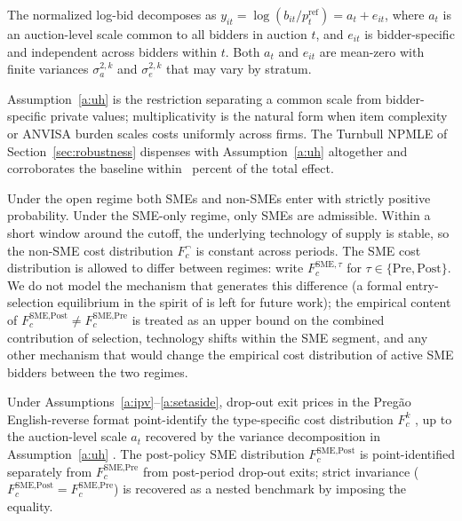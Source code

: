 \begin{assumption}\label{a:uh}
The normalized log-bid decomposes as $y_{it} = \log(b_{it} / p_t^{\mathrm{ref}}) = a_t + e_{it}$, where $a_t$ is an auction-level scale common to all bidders in auction $t$, and $e_{it}$ is bidder-specific and independent across bidders within $t$. Both $a_t$ and $e_{it}$ are mean-zero with finite variances $\sigma_a^{2,k}$ and $\sigma_e^{2,k}$ that may vary by stratum.
\end{assumption}

Assumption~\ref{a:uh} is the \citet{krasnokutskaya2011} restriction separating a common scale from bidder-specific private values; multiplicativity is the natural form when item complexity or ANVISA burden scales costs uniformly across firms. The Turnbull NPMLE of Section~\ref{sec:robustness} dispenses with Assumption~\ref{a:uh} altogether and corroborates the baseline within \turnbullDeviationPct~percent of the total effect.

\begin{assumption}\label{a:setaside}
Under the open regime both SMEs and non-SMEs enter with strictly positive probability. Under the SME-only regime, only SMEs are admissible. Within a short window around the cutoff, the underlying technology of supply is stable, so the non-SME cost distribution $F_c^{\neg}$ is constant across periods. The SME cost distribution is allowed to differ between regimes: write $F_c^{\text{SME},\tau}$ for $\tau \in \{\text{Pre},\text{Post}\}$. We do not model the mechanism that generates this difference (a formal entry-selection equilibrium in the spirit of \citet{krasnokutskayaseim2011} is left for future work); the empirical content of $F_c^{\text{SME,Post}} \neq F_c^{\text{SME,Pre}}$ is treated as an upper bound on the combined contribution of selection, technology shifts within the SME segment, and any other mechanism that would change the empirical cost distribution of active SME bidders between the two regimes.
\end{assumption}

\begin{proposition}\label{prop:identification}
Under Assumptions~\ref{a:ipv}--\ref{a:setaside}, drop-out exit prices in the Preg\~ao English-reverse format point-identify the type-specific cost distribution $F_c^k$ \citep{haile2003}, up to the auction-level scale $a_t$ recovered by the variance decomposition in Assumption~\ref{a:uh} \citep{krasnokutskaya2011}. The post-policy SME distribution $F_c^{\text{SME,Post}}$ is point-identified separately from $F_c^{\text{SME,Pre}}$ from post-period drop-out exits; strict invariance ($F_c^{\text{SME,Post}} = F_c^{\text{SME,Pre}}$) is recovered as a nested benchmark by imposing the equality.
\end{proposition}

